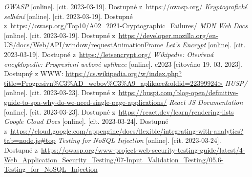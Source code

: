 \begin{thebibliography}{99}
     \textit{OWASP} [online]. [cit. 2023-03-19]. Dostupné z~\url{https://owasp.org/}
     \textit{Kryptografické selhání} [online]. [cit. 2023-03-19]. Dostupné z~\url{https://owasp.org/Top10/A02_2021-Cryptographic_Failures/}
     \textit{MDN Web Docs} [online]. [cit. 2023-03-19]. Dostupné z~\url{https://developer.mozilla.org/en-US/docs/Web/API/window/requestAnimationFrame}
     \textit{Let's Encrypt} [online]. [cit. 2023-03-19]. Dostupné z~\url{https://letsencrypt.org/}
     \textit{Wikipedie: Otevřená encyklopedie: Progresivní webové aplikace} [online]. c2023 [citováno 19. 03. 2023]. Dostupný z WWW: \url{https://cs.wikipedia.org/w/index.php?title=Progresivn%C3%AD_webov%C3%A9_aplikace&oldid=22399924>}
     \textit{HUSP/} [online]. [cit. 2023-03-23]. Dostupné z~\url{https://huspi.com/blog-open/definitive-guide-to-spa-why-do-we-need-single-page-applications/}
     \textit{React JS Documentation} [online]. [cit. 2023-03-23]. Dostupné z~\url{https://react.dev/learn/rendering-lists}
     \textit{Google Cloud Docs} [online]. [cit. 2023-03-24]. Dostupné z~\url{https://cloud.google.com/appengine/docs/flexible/integrating-with-analytics?tab=node.js#top}
     \textit{Testing for NoSQL Injection} [online]. [cit. 2023-03-24]. Dostupné z~\url{https://owasp.org/www-project-web-security-testing-guide/latest/4-Web_Application_Security_Testing/07-Input_Validation_Testing/05.6-Testing_for_NoSQL_Injection}
\end{thebibliography}